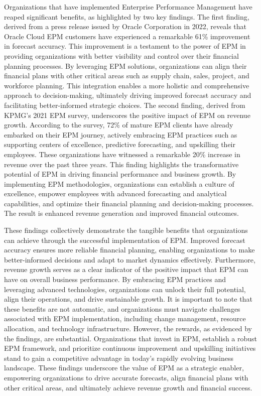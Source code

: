 \documentclass[12pt,a4paper,openright,twoside]{book}
\begin{document}
Organizations that have implemented Enterprise Performance Management have reaped significant benefits, as highlighted by two key findings. 
%
The first finding, derived from a press release issued by Oracle Corporation in 2022\cite{toomey2022oracle}, reveals that Oracle Cloud EPM customers have experienced a remarkable 61\% improvement in forecast accuracy. 
%
This improvement is a testament to the power of EPM in providing organizations with better visibility and control over their financial planning processes. 
%
By leveraging EPM solutions, organizations can align their financial plans with other critical areas such as supply chain, sales, project, and workforce planning. 
%
This integration enables a more holistic and comprehensive approach to decision-making, ultimately driving improved forecast accuracy and facilitating better-informed strategic choices.
%
The second finding, derived from KPMG's 2021 EPM survey\cite{kpmg2021survey}, underscores the positive impact of EPM on revenue growth. 
%
According to the survey, 72\% of mature EPM clients have already embarked on their EPM journey, actively embracing EPM practices such as supporting centers of excellence, predictive forecasting, and upskilling their employees. 
%
These organizations have witnessed a remarkable 20\% increase in revenue over the past three years. 
%
This finding highlights the transformative potential of EPM in driving financial performance and business growth. 
%
By implementing EPM methodologies, organizations can establish a culture of excellence, empower employees with advanced forecasting and analytical capabilities, and optimize their financial planning and decision-making processes. 
%
The result is enhanced revenue generation and improved financial outcomes.

These findings collectively demonstrate the tangible benefits that organizations can achieve through the successful implementation of EPM. 
%
Improved forecast accuracy ensures more reliable financial planning, enabling organizations to make better-informed decisions and adapt to market dynamics effectively. 
%
Furthermore, revenue growth serves as a clear indicator of the positive impact that EPM can have on overall business performance. 
%
By embracing EPM practices and leveraging advanced technologies, organizations can unlock their full potential, align their operations, and drive sustainable growth.
%
It is important to note that these benefits are not automatic, and organizations must navigate challenges associated with EPM implementation, including change management, resource allocation, and technology infrastructure. 
%
However, the rewards, as evidenced by the findings, are substantial. 
%
Organizations that invest in EPM, establish a robust EPM framework, and prioritize continuous improvement and upskilling initiatives stand to gain a competitive advantage in today's rapidly evolving business landscape. 
%
These findings underscore the value of EPM as a strategic enabler, empowering organizations to drive accurate forecasts, align financial plans with other critical areas, and ultimately achieve revenue growth and financial success.
\end{document}
